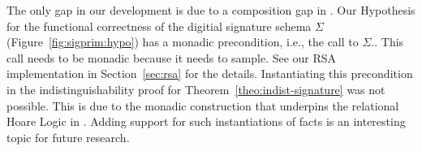 %
The only gap in our development is due to a composition
gap in \ssprove.
%
Our Hypothesis for the functional correctness of the
digitial signature schema $\Sigma$ (Figure~\ref{fig:sigprim:hypo})
has a monadic precondition, i.e., the call to $\Sigma$..
%
This call needs to be monadic because it needs to sample.
%
See our RSA implementation in Section~\ref{sec:rsa} for 
the details.
%
Instantiating this precondition in the indistinguishability 
proof for Theorem~\ref{theo:indist-signature} was not
possible.
%
This is due to the monadic construction that underpins
the relational Hoare Logic in \ssprove.
%
Adding support for such instantiations of facts
is an interesting topic for future research.
%
